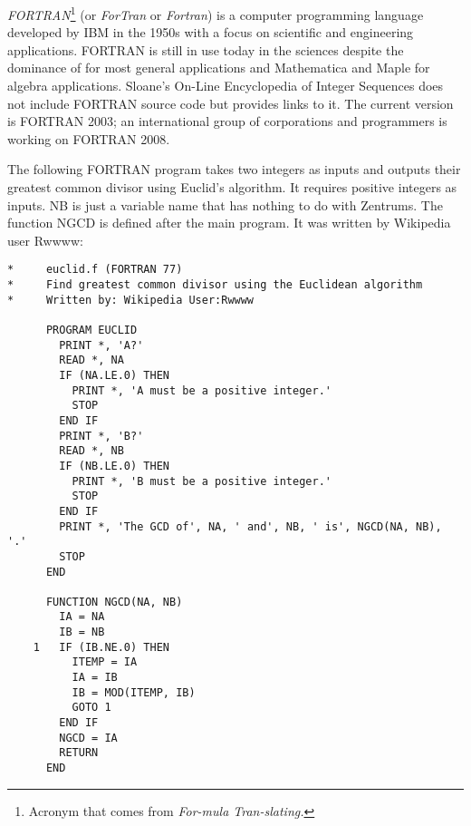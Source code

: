 \documentclass[12pt]{article}
\begin{document}
{\em FORTRAN}{\footnote{Acronym that comes from \emph{For-mula Tran-slating.}}} (or {\em ForTran} or {\em Fortran}) is a computer programming language developed by IBM in the 1950s with a focus on scientific and engineering applications. FORTRAN is still in use today in the sciences despite the dominance of  for most general applications and Mathematica and Maple for algebra applications. Sloane's On-Line Encyclopedia of Integer Sequences does not include FORTRAN source code but provides links to it. The current version is FORTRAN 2003; an international group of corporations and programmers is working on FORTRAN 2008. %

The following FORTRAN program takes two integers as inputs and outputs their greatest common divisor using Euclid's algorithm. It requires positive integers as inputs. NB is just a variable name that has nothing to do with Zentrums. The function NGCD is defined after the main program. It was written by Wikipedia user Rwwww:

\begin{verbatim}
*     euclid.f (FORTRAN 77)
*     Find greatest common divisor using the Euclidean algorithm
*     Written by: Wikipedia User:Rwwww

      PROGRAM EUCLID
        PRINT *, 'A?'
        READ *, NA
        IF (NA.LE.0) THEN
          PRINT *, 'A must be a positive integer.'
          STOP
        END IF
        PRINT *, 'B?'
        READ *, NB
        IF (NB.LE.0) THEN
          PRINT *, 'B must be a positive integer.'
          STOP
        END IF
        PRINT *, 'The GCD of', NA, ' and', NB, ' is', NGCD(NA, NB), '.'
        STOP
      END

      FUNCTION NGCD(NA, NB)
        IA = NA
        IB = NB
    1   IF (IB.NE.0) THEN
          ITEMP = IA
          IA = IB
          IB = MOD(ITEMP, IB)
          GOTO 1
        END IF
        NGCD = IA
        RETURN
      END
\end{verbatim}
\end{document}
